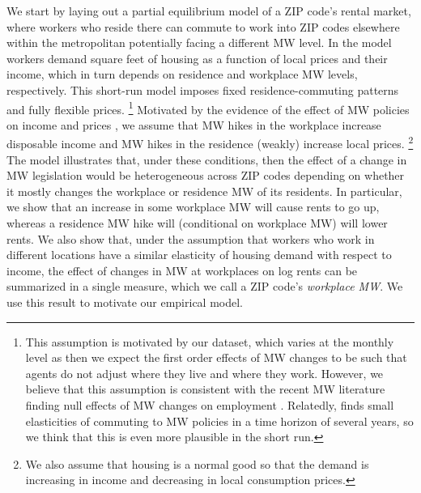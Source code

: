 We start by laying out a partial equilibrium model of a ZIP code's rental market, 
where workers who reside there can commute to work into ZIP codes elsewhere
within the metropolitan potentially facing a different MW level.
In the model workers demand square feet of housing as a function
of local prices and their income, which in turn depends on residence and workplace MW 
levels, respectively.
This short-run model imposes fixed residence-commuting patterns and fully flexible prices.%
\footnote{This assumption is motivated by our dataset, which varies at the monthly
level as then we expect the first order effects of MW changes to be such that agents do not
adjust where they live and where they work. However, we believe that this assumption is 
consistent with the recent MW literature finding null effects of MW changes on employment 
\parencite[see][for a review]{Dube2019}. Relatedly, \textcite{PerezPerez2021} finds small 
elasticities of commuting to MW policies in a time horizon of several years, so we think that 
this is even more plausible in the short run.}
Motivated by the evidence of the effect of MW policies on income and prices 
\parencite{AllegrettoReich2018,Leung2021}, we assume that MW hikes in the workplace 
increase disposable income and MW hikes in the residence (weakly) increase local prices.%
\footnote{We also assume that housing is a normal good so that the demand is 
increasing in income and decreasing in local consumption prices.}
The model illustrates that, under these conditions, then the effect of a change in 
MW legislation would be heterogeneous across ZIP codes depending on whether it 
mostly changes the workplace or residence MW of its residents.
In particular, we show that an increase in some workplace MW will cause rents to go up, 
whereas a residence MW hike will (conditional on workplace MW) will lower rents.
We also show that, under the assumption that workers who work in different locations
have a similar elasticity of housing demand with respect to income, the effect of changes in
MW at workplaces on log rents can be summarized in a single measure, which we call
a ZIP code's \textit{workplace MW}. We use this result to motivate our empirical model.


